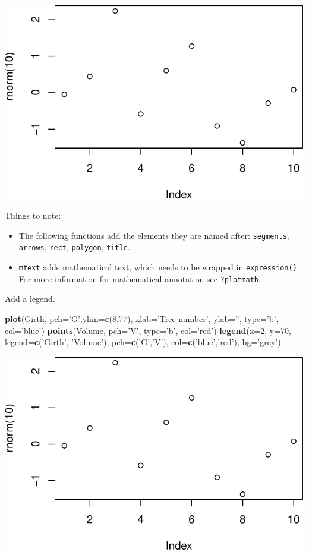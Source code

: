 \documentclass[]{book}
\newenvironment{Shaded}{\begin{snugshade}}{\end{snugshade}}
\newcommand{\DataTypeTok}[1]{\textcolor[rgb]{0.13,0.29,0.53}{#1}}
\newcommand{\DecValTok}[1]{\textcolor[rgb]{0.00,0.00,0.81}{#1}}
\newcommand{\KeywordTok}[1]{\textcolor[rgb]{0.13,0.29,0.53}{\textbf{#1}}}
\newcommand{\NormalTok}[1]{#1}
\newcommand{\StringTok}[1]{\textcolor[rgb]{0.31,0.60,0.02}{#1}}
\providecommand{\tightlist}{%
  \setlength{\itemsep}{0pt}\setlength{\parskip}{0pt}}
\theoremstyle{definition}
\theoremstyle{definition}
\theoremstyle{definition}
\theoremstyle{remark}
\begin{document}
\includegraphics[width=0.5\linewidth]{Rcourse_files/figure-latex/unnamed-chunk-257-1}

Things to note:

\begin{itemize}
\tightlist
\item
  The following functions add the elements they are named after: \texttt{segments}, \texttt{arrows}, \texttt{rect}, \texttt{polygon}, \texttt{title}.
\item
  \texttt{mtext} adds mathematical text, which needs to be wrapped in \texttt{expression()}. For more information for mathematical annotation see \texttt{?plotmath}.
\end{itemize}

Add a legend.

\begin{Shaded}
\begin{Highlighting}[]
\KeywordTok{plot}\NormalTok{(Girth, }\DataTypeTok{pch=}\StringTok{'G'}\NormalTok{,}\DataTypeTok{ylim=}\KeywordTok{c}\NormalTok{(}\DecValTok{8}\NormalTok{,}\DecValTok{77}\NormalTok{), }\DataTypeTok{xlab=}\StringTok{'Tree number'}\NormalTok{, }\DataTypeTok{ylab=}\StringTok{''}\NormalTok{, }\DataTypeTok{type=}\StringTok{'b'}\NormalTok{, }\DataTypeTok{col=}\StringTok{'blue'}\NormalTok{)}
\KeywordTok{points}\NormalTok{(Volume, }\DataTypeTok{pch=}\StringTok{'V'}\NormalTok{, }\DataTypeTok{type=}\StringTok{'b'}\NormalTok{, }\DataTypeTok{col=}\StringTok{'red'}\NormalTok{)}
\KeywordTok{legend}\NormalTok{(}\DataTypeTok{x=}\DecValTok{2}\NormalTok{, }\DataTypeTok{y=}\DecValTok{70}\NormalTok{, }\DataTypeTok{legend=}\KeywordTok{c}\NormalTok{(}\StringTok{'Girth'}\NormalTok{, }\StringTok{'Volume'}\NormalTok{), }\DataTypeTok{pch=}\KeywordTok{c}\NormalTok{(}\StringTok{'G'}\NormalTok{,}\StringTok{'V'}\NormalTok{), }\DataTypeTok{col=}\KeywordTok{c}\NormalTok{(}\StringTok{'blue'}\NormalTok{,}\StringTok{'red'}\NormalTok{), }\DataTypeTok{bg=}\StringTok{'grey'}\NormalTok{)}
\end{Highlighting}
\end{Shaded}

\includegraphics[width=0.5\linewidth]{Rcourse_files/figure-latex/unnamed-chunk-258-1}
\end{document}
